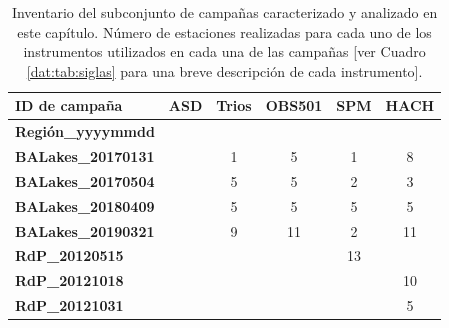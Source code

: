     \begin{table}
    \caption[Inventario del subconjunto de campañas analizado.]{Inventario del subconjunto de campañas caracterizado y analizado en este capítulo. Número de estaciones realizadas para cada uno de los instrumentos utilizados en cada una de las campañas [ver Cuadro \ref{dat:tab:siglas} para una breve descripción de cada instrumento].}
    \small
    \begin{tabular}{|l|c|c|c|c|c|}
    \hline
    \textbf{ID de campaña}                            & \textbf{ASD}             & \textbf{Trios}           & \textbf{OBS501}          & \textbf{SPM}             & \textbf{HACH}            \\ \hline
    \textbf{Región\_yyyymmdd}                         & \cellcolor[HTML]{000000} & \cellcolor[HTML]{000000} & \cellcolor[HTML]{000000} & \cellcolor[HTML]{000000} & \cellcolor[HTML]{000000} \\ \hline
    {\color[HTML]{009901} \textbf{BALakes\_20170131}} &                          & 1                        & 5                        & 1                        & 8                        \\ \hline
    {\color[HTML]{009901} \textbf{BALakes\_20170504}} &                          & 5                        & 5                        & 2                        & 3                        \\ \hline
    {\color[HTML]{009901} \textbf{BALakes\_20180409}} &                          & 5                        & 5                        & 5                        & 5                        \\ \hline
    {\color[HTML]{009901} \textbf{BALakes\_20190321}} &                          & 9                        & 11                       & 2                        & 11                       \\ \hline
    {\color[HTML]{3166FF} \textbf{RdP\_20120515}}     &                          &                          &                          & 13                       &                          \\ \hline
    {\color[HTML]{3166FF} \textbf{RdP\_20121018}}     &                          &                          &                          &                          & 10                       \\ \hline
    {\color[HTML]{3166FF} \textbf{RdP\_20121031}}     &                          &                          &                          &                          & 5                        \\ \hline

\end{tabular}
\end{table}
